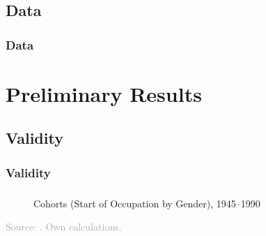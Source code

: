 \documentclass[11pt, aspectratio=1610, xcolor={dvipsnames}]{beamer}
\begin{document}
	\subsection{Data}
	\begin{frame}
		\frametitle{Data}
	\end{frame}
	
	\section{Preliminary Results}
	\begin{frame}
		\frametitle{}
	\end{frame}
	
	\subsection{Validity}
	\begin{frame}
		\frametitle{Validity}
	\end{frame}
	
	\begin{frame}
		\frametitle{}
		
		\begin{figure}[h]
			\centering
			\caption{Cohorts (Start of Occupation by Gender), 1945--1990}
			\label{fig:validity}
			\resizebox{75mm}{!}{}
		\end{figure}
		
		{\scriptsize
			\textcolor{darkgray}{Source: \cite{Mayer1995}. Own calculations.}
		}
		
	\end{frame}
	
\end{document}
